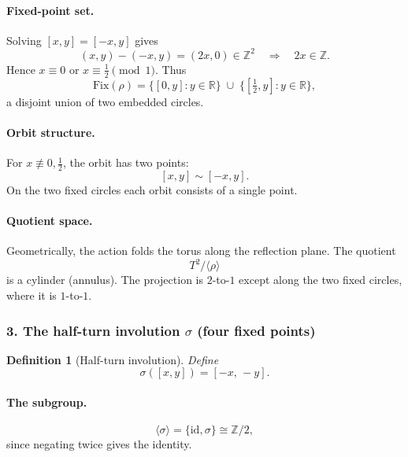 \documentclass[12pt,a4paper]{article}
\theoremstyle{plain}
\newtheorem{definition}{Definition}
\theoremstyle{definition}      %
\begin{document}
\paragraph{Fixed-point set.}
Solving \([x,y]=[-x,y]\) gives
\[
(x,y)-(-x,y)=(2x,0)\in\mathbb{Z}^{2}
\quad\Longrightarrow\quad
2x\in\mathbb{Z}.
\]
Hence \(x\equiv 0\) or \(x\equiv \tfrac12\pmod{1}\).  
Thus
\[
\mathrm{Fix}(\rho)
= \{[0,y]:y\in\mathbb{R}\}
\;\cup\;
\{[\tfrac12,y]:y\in\mathbb{R}\},
\]
a disjoint union of two embedded circles.

\paragraph{Orbit structure.}
For \(x\not\equiv 0,\tfrac12\), the orbit has two points:
\[
[x,y] \sim [-x,y].
\]
On the two fixed circles each orbit consists of a single point.

\paragraph{Quotient space.}
Geometrically, the action folds the torus along the reflection plane.
The quotient
\[
T^{2}/\langle\rho\rangle
\]
is a cylinder (annulus).  
The projection is \(2\)-to-\(1\) except along the two fixed circles,
where it is \(1\)-to-\(1\).

\subsubsection*{3. The half-turn involution \(\sigma\) (four fixed points)}

\begin{definition}[Half-turn involution]
	Define
	\[
	\sigma([x,y]) = [-x,\,-y].
	\]
\end{definition}

\paragraph{The subgroup.}
\[
\langle \sigma \rangle = \{\mathrm{id},\sigma\} \cong \mathbb{Z}/2,
\]
since negating twice gives the identity.
\end{document}
